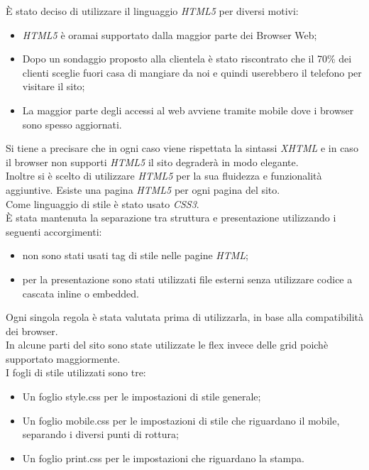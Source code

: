 È stato deciso di utilizzare il linguaggio \emph{HTML5} per diversi motivi:
\begin{itemize} %
	\item \emph{HTML5} è oramai supportato dalla maggior parte dei Browser Web;
	\item Dopo un sondaggio proposto alla clientela è stato riscontrato che il 70\% dei clienti sceglie fuori casa di mangiare da noi e quindi userebbero il telefono per visitare il sito;
	\item La maggior parte degli accessi al web avviene tramite mobile dove i browser sono spesso aggiornati.
\end{itemize}
Si tiene a precisare che in ogni caso viene rispettata la sintassi \emph{XHTML} e in caso il browser non supporti \emph{HTML5} il sito degraderà in modo elegante.\\
Inoltre si è scelto di utilizzare \emph{HTML5} per la sua fluidezza e funzionalità aggiuntive. %
Esiste una pagina \emph{HTML5} per ogni pagina del sito.\\ %
Come linguaggio di stile è stato usato \emph{CSS3}.\\
È stata mantenuta la separazione tra struttura e presentazione utilizzando i seguenti accorgimenti: 
\begin{itemize}
    \item non sono stati usati tag di stile nelle pagine \emph{HTML};
    \item per la presentazione sono stati utilizzati file esterni senza utilizzare codice a cascata inline o embedded.
\end{itemize}
Ogni singola regola è stata valutata prima di utilizzarla, in base alla compatibilità dei browser.\\
In alcune parti del sito sono state utilizzate le flex invece delle grid poichè supportato maggiormente.\\
I fogli di stile utilizzati sono tre:
\begin{itemize}
	\item Un foglio style.css per le impostazioni di stile generale;
	\item Un foglio mobile.css per le impostazioni di stile che riguardano il mobile, separando i diversi punti di rottura; %
	\item Un foglio print.css per le impostazioni che riguardano la stampa.
\end{itemize}